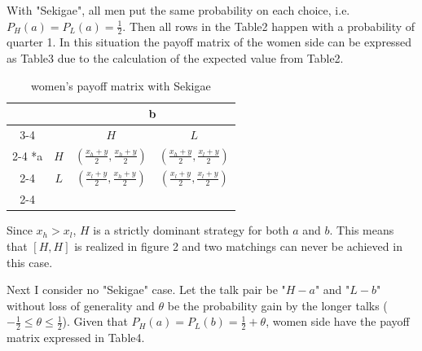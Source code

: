 \documentclass{article}
\begin{document}
          \par
          With "Sekigae", all men put the same probability on each choice, i.e. $P_H(a) = P_L(a) = \frac{1}{2}$. Then all rows in the Table2 happen with a probability of quarter 1. In this situation the payoff matrix of the women side can be expressed as Table3 due to the calculation of the expected value from Table2.

	\begin{table}[h]
		\begin{center}
		\begingroup
                \renewcommand{\arraystretch}{1.5}
                \setlength{\extrarowheight}{2pt}
                \begin{tabular}{*{4}{c|}}
                  \multicolumn{2}{c}{} & \multicolumn{2}{c}{b}\\\cline{3-4}
                  \multicolumn{1}{c}{} &  & $H$  & $L$ \\\cline{2-4}
                  \multirow{2}*{a}  & $H$ & $(\frac{x_h+y}{2}, \frac{x_h+y}{2})$ & $(\frac{x_h+y}{2}, \frac{x_l+y}{2})$ \\\cline{2-4}
                  & $L$ & $(\frac{x_l+y}{2}, \frac{x_h+y}{2})$ & $(\frac{x_l+y}{2}, \frac{x_l+y}{2})$ \\\cline{2-4}
                \end{tabular}
                \endgroup
                \end{center}
                \caption{women's payoff matrix with Sekigae}
  	\end{table}
	
	\par
	Since $x_h > x_l$, $H$ is a strictly dominant strategy for both $a$ and $b$. This means that $[H, H]$ is realized in figure 2 and  two matchings can never be achieved in this case.
	\par
	Next I consider no "Sekigae" case. Let the talk pair be "$H - a$" and "$L - b$" without loss of generality and $\theta$ be the probability gain by the longer talks ($-\frac{1}{2} \leq \theta \leq \frac{1}{2}$). Given that $P_H(a) = P_L(b) = \frac{1}{2} + \theta$, women side have the payoff matrix expressed in Table4.
\end{document}
